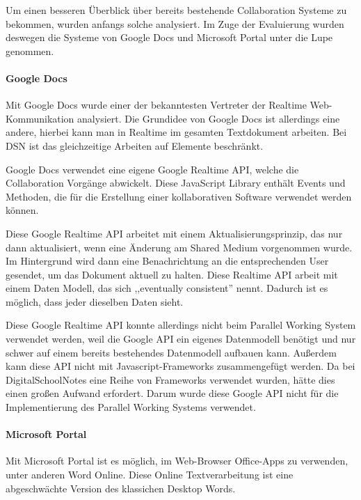 
Um einen besseren Überblick über bereits bestehende Collaboration Systeme zu bekommen, wurden anfangs solche analysiert. Im Zuge der Evaluierung wurden deswegen die Systeme von Google Docs und Microsoft Portal unter die Lupe genommen.
\paragraph{Google Docs}
Mit Google Docs wurde einer der bekanntesten Vertreter der Realtime Web-Kommunikation analysiert. Die Grundidee von Google Docs ist allerdings eine andere, hierbei kann man in Realtime im gesamten Textdokument arbeiten. Bei DSN ist das gleichzeitige Arbeiten auf Elemente beschränkt.

Google Docs verwendet eine eigene Google Realtime API, welche die Collaboration Vorgänge abwickelt. Diese JavaScript Library enthält Events und Methoden, die für die Erstellung einer kollaborativen Software verwendet werden können.

Diese Google Realtime API arbeitet mit einem Aktualisierungsprinzip, das nur dann aktualisiert, wenn eine Änderung am Shared Medium vorgenommen wurde. Im Hintergrund wird dann eine Benachrichtung an die entsprechenden User gesendet, um das Dokument aktuell zu halten. Diese Realtime API arbeit mit einem Daten Modell, das sich ,,eventually consistent'' nennt. Dadurch ist es möglich, dass jeder dieselben Daten sieht.\cite{GOOGLE}

Diese Google Realtime API konnte allerdings nicht beim Parallel Working System verwendet werden, weil die Google API ein eigenes Datenmodell benötigt und nur schwer auf einem bereits bestehendes Datenmodell aufbauen kann. Außerdem kann diese API nicht mit Javascript-Frameworks zusammengefügt werden. Da bei DigitalSchoolNotes eine Reihe von Frameworks verwendet wurden, hätte dies einen großen Aufwand erfordert. Darum wurde diese Google API nicht für die Implementierung des Parallel Working Systems verwendet.

\newpage

\paragraph{Microsoft Portal}
Mit Microsoft Portal ist es möglich, im Web-Browser Office-Apps zu verwenden, unter anderen Word Online. Diese Online Textverarbeitung ist eine abgeschwächte Version des klassichen Desktop Words.

